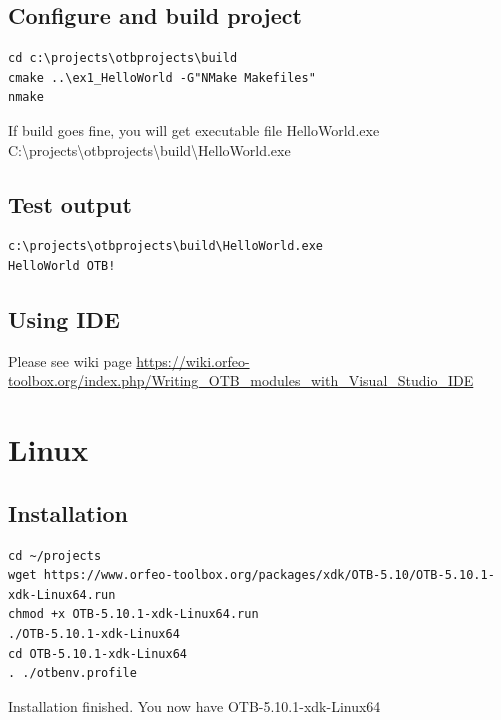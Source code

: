 \documentclass[10pt,a4paper]{article}
\begin{document}
\subsection{Configure and build project}

\begin{verbatim}
cd c:\projects\otbprojects\build
cmake ..\ex1_HelloWorld -G"NMake Makefiles"
nmake
\end{verbatim}
If build goes fine, you will get executable file HelloWorld.exe
\newline
C:{\textbackslash}projects{\textbackslash}otbprojects{\textbackslash}build{\textbackslash}HelloWorld.exe
\newline

\subsection{Test output}

\begin{verbatim}
c:\projects\otbprojects\build\HelloWorld.exe
HelloWorld OTB!
\end{verbatim}

\subsection{Using IDE}


Please see wiki page \url{https://wiki.orfeo-toolbox.org/index.php/Writing_OTB_modules_with_Visual_Studio_IDE}



\section{Linux}

\subsection{Installation}

\begin{verbatim}
cd ~/projects
wget https://www.orfeo-toolbox.org/packages/xdk/OTB-5.10/OTB-5.10.1-xdk-Linux64.run
chmod +x OTB-5.10.1-xdk-Linux64.run
./OTB-5.10.1-xdk-Linux64
cd OTB-5.10.1-xdk-Linux64
. ./otbenv.profile
\end{verbatim}
Installation finished. You now have OTB-5.10.1-xdk-Linux64
\newline
\end{document}

